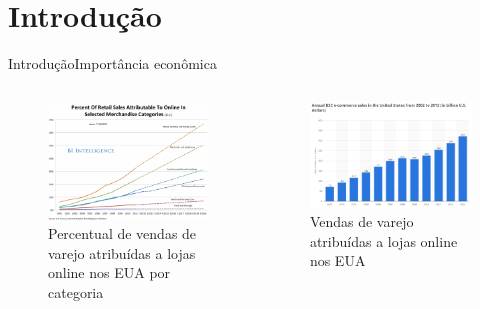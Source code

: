 \section[Introdução]{Introdução}


\begin{frame}{Introdução}{Importância econômica}
\begin{columns}[b] %


\begin{figure}[ht]
    \begin{center}
    \includegraphics[width=1\textwidth]{img/crescimento-ecommerce}\caption{Percentual de vendas de varejo atribuídas a lojas online nos EUA por categoria \cite{crescimento-ecommerce}}
    \end{center}
\end{figure}

\begin{figure}[ht]
    \begin{center}
    \includegraphics[width=1\textwidth]{img/sales-ecommerce}\caption{Vendas de varejo atribuídas a lojas online nos EUA \cite{sales-ecommerce}}
    \end{center}
\end{figure}


\end{columns}
\end{frame}
